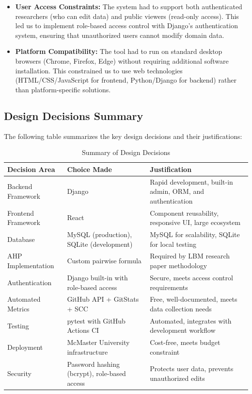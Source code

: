 \documentclass{article}
\begin{document}
\begin{itemize}
  \item \textbf{User Access Constraints:} The system had to support both authenticated researchers (who can edit data) and public viewers (read-only access). This led us to implement role-based access control with Django's authentication system, ensuring that unauthorized users cannot modify domain data.

  \item \textbf{Platform Compatibility:} The tool had to run on standard desktop browsers (Chrome, Firefox, Edge) without requiring additional software installation. This constrained us to use web technologies (HTML/CSS/JavaScript for frontend, Python/Django for backend) rather than platform-specific solutions.
\end{itemize}

\subsection{Design Decisions Summary}

The following table summarizes the key design decisions and their justifications:

\begin{table}[H]
\centering
\caption{Summary of Design Decisions}
\label{tab:design-decisions}
\begin{tabular}{p{4cm} p{4.5cm} p{5.5cm}}
\toprule
\textbf{Decision Area} & \textbf{Choice Made} & \textbf{Justification} \\
\midrule
Backend Framework & Django & Rapid development, built-in admin, ORM, and authentication \\
\midrule
Frontend Framework & React & Component reusability, responsive UI, large ecosystem \\
\midrule
Database & MySQL (production), SQLite (development) & MySQL for scalability, SQLite for local testing \\
\midrule
AHP Implementation & Custom pairwise formula & Required by LBM research paper methodology \\
\midrule
Authentication & Django built-in with role-based access & Secure, meets access control requirements \\
\midrule
Automated Metrics & GitHub API + GitStats + SCC & Free, well-documented, meets data collection needs \\
\midrule
Testing & pytest with GitHub Actions CI & Automated, integrates with development workflow \\
\midrule
Deployment & McMaster University infrastructure & Cost-free, meets budget constraint \\
\midrule
Security & Password hashing (bcrypt), role-based access & Protects user data, prevents unauthorized edits \\
\bottomrule
\end{tabular}
\end{table}
\end{document}
